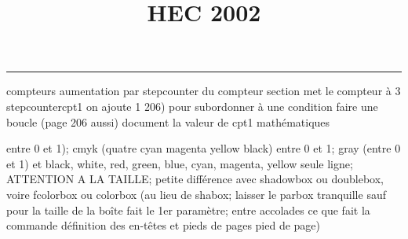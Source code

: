 \documentclass[11pt]{article}%
\title{\bf \vspace{-1cm} HEC 2002} %
\author{} %
\date{} %
\renewcommand{\headrulewidth}{0pt}%
\renewcommand{\footrulewidth}{0.4pt}%
\begin{document}
\maketitle %
\vspace{-1.2cm}\hrule %
\thispagestyle{fancy}

\vspace*{.4cm}


compteurs%
aumentation par stepcounter du compteur section%
met le compteur à 3%
stepcounter{cpt1} on ajoute 1%
206) pour subordonner à une condition %
faire une boucle (page 206 aussi) %
document la valeur de cpt1 
mathématiques\newcommand{\ch}{\operatorname{ch}} 
\newcommand{\sh}{\operatorname{sh}}
\renewcommand{\tanh}{\operatorname{th}}
\renewcommand{\sinh}{\operatorname{sh}}
\renewcommand{\cosh}{\operatorname{ch}}
\newcommand{\argsh}{\operatorname{argsh}}
\newcommand{\argch}{\operatorname{argch}}
\newcommand{\argth}{\operatorname{argth}}
\newcommand{\Id}{\operatorname{Id}}
\renewcommand{\leq}{\leq}
\renewcommand{\geq}{\geq }

\newcommand{\dlim}{\lim}
\newcommand{\dsum}{\sum}
\newcommand{\dprod}{\prod}



entre 0 et 1); cmyk (quatre cyan magenta yellow black) entre 0 et 1;
gray (entre 0 et 1) et black, white, red, green, blue, cyan, magenta,
yellow%
seule ligne; ATTENTION A LA TAILLE; petite différence avec shadowbox ou
doublebox, voire fcolorbox ou colorbox (au lieu de shabox; laisser le
parbox tranquille sauf pour la taille de la boîte
\newcommand{\Tbox}[1]{\begin{center} \shabox{\parbox{0.6
\linewidth}{#1}} \end{center}} %
fait le 1er paramètre; entre accolades ce que fait la commande
définition des en-têtes et pieds de pages\pagestyle{fancy}
\chead{}
\rfoot[ \ \thepage]{\thepage}
\cfoot{}
\lfoot{}
\thispagestyle{fancy} %
pied de page)\renewcommand{\footrulewidth}{0.4pt}
\renewcommand{\headrulewidth}{0.4pt}
\end{document}
